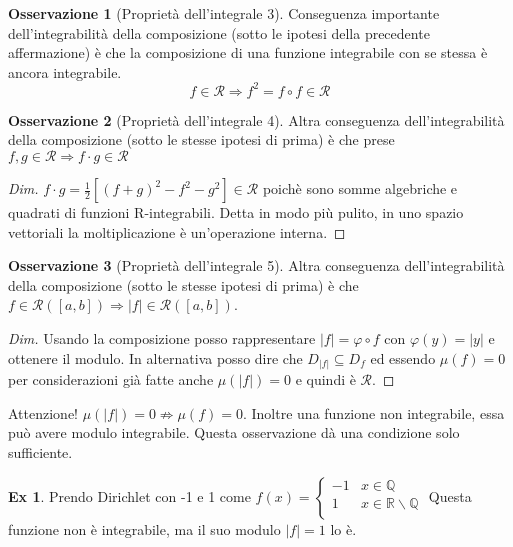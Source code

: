 \documentclass{article}
\theoremstyle{definition}
\theoremstyle{definition}
\theoremstyle{definition}
\theoremstyle{definition}
\newtheorem{remark}{Osservazione}[section]
\theoremstyle{definition}
\newtheorem{example}{Ex}[section]
\begin{document}
\begin{remark}[Proprietà dell'integrale 3]
    Conseguenza importante dell'integrabilità della composizione (sotto le ipotesi della precedente affermazione) è che la composizione di una funzione integrabile con se stessa è ancora integrabile.
    \[
        f\in\mathcal{R} \Rightarrow f^2=f\circ f\in\mathcal{R}
    \]
\end{remark}

\begin{remark}[Proprietà dell'integrale 4]
    Altra conseguenza dell'integrabilità della composizione (sotto le stesse ipotesi di prima) è che prese $f,g \in \mathcal{R} \Rightarrow f\cdot g \in \mathcal{R}$
    \begin{proof}[Dim]
        $f\cdot g = \frac{1}{2}[(f+g)^2-f^2-g^2] \in \mathcal{R}$ poichè sono somme algebriche e quadrati di funzioni R-integrabili. Detta in modo più pulito, in uno spazio vettoriali la moltiplicazione è un'operazione interna.
    \end{proof}
\end{remark}

\begin{remark}[Proprietà dell'integrale 5]
    Altra conseguenza dell'integrabilità della composizione (sotto le stesse ipotesi di prima) è che $f\in\mathcal{R}([a,b])\Rightarrow |f|\in \mathcal{R}([a,b])$.
    \begin{proof}[Dim]
        Usando la composizione posso rappresentare $|f|=\varphi \circ f$ con $\varphi(y)=|y|$ e ottenere il modulo. In alternativa posso dire che $D_{|f|}\subseteq D_f$ ed essendo $\mu(f)=0$ per considerazioni già fatte anche $\mu(|f|)=0$ e quindi è $\mathcal{R}$.
        \end{proof}
        Attenzione! $\mu(|f|)=0 \nRightarrow \mu(f)=0$. Inoltre una funzione non integrabile, essa può avere modulo integrabile. Questa osservazione dà una condizione solo sufficiente.
\end{remark}

\begin{example}
    Prendo Dirichlet con -1 e 1 come $f(x)=\begin{cases}
        -1 & x\in\mathbb{Q} \\
        1 & x\in\mathbb{R}\backslash\mathbb{Q}\\
    \end{cases}$
    Questa funzione non è integrabile, ma il suo modulo $|f|=1$ lo è.
\end{example}
\end{document}
